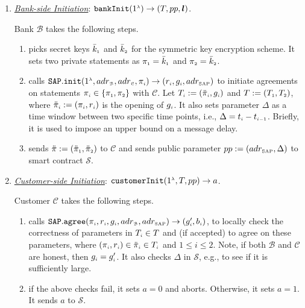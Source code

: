 \begin{enumerate}[leftmargin=.46cm]
\item\label{RCPoRP::Bank-side-Initiation}  \underline{\textit{Bank-side Initiation}}: $\mathtt{bankInit}(1^{\scriptscriptstyle \lambda})\rightarrow (T, pp, \bm l)$.

Bank $\mathcal{B}$ takes the following steps. 
\begin{enumerate}

\item\label{RCPoRP::setup} picks   secret keys $\bar k_{\scriptscriptstyle 1}$ and $\bar k_{\scriptscriptstyle 2}$ for the symmetric key encryption scheme. It  sets two private statements as $\pi_{\scriptscriptstyle 1}=\bar k_{\scriptscriptstyle 1}$ and $\pi_{\scriptscriptstyle 2}= \bar k_{\scriptscriptstyle 2}$.
%
\item\label{RCPoRP::set-qp}  calls $\mathtt{SAP.init}(1^{\scriptscriptstyle\lambda}, adr_{\scriptscriptstyle\mathcal{B}}, adr_{\scriptscriptstyle\mathcal{C}}, \pi_{\scriptscriptstyle i})\rightarrow(r_{
\scriptscriptstyle i}, g_{\scriptscriptstyle i}, adr_{\scriptscriptstyle\text{SAP}})$ to initiate  agreements on  statements $\pi_{\scriptscriptstyle i}\in \{\pi_{\scriptscriptstyle 1}, \pi_{\scriptscriptstyle 2}\}$  with  $\mathcal{C}$.  Let $T_{\scriptscriptstyle i}:=(\ddot{\pi}_{\scriptscriptstyle i}, g_{\scriptscriptstyle i})$ and $T:=(T_{\scriptscriptstyle 1}, T_{\scriptscriptstyle 2})$,  where  $\ddot{\pi}_{\scriptscriptstyle i}:=(\pi_{\scriptscriptstyle i}, r_{\scriptscriptstyle i})$ is the opening of $g_{\scriptscriptstyle i}$.  It also sets parameter $\Delta$ as a time window between two specific time points, i.e., $\Delta=t_{\scriptscriptstyle i} - t_{\scriptscriptstyle i-1}$. Briefly, it is used to impose an upper bound on a message delay.  %
%
\item sends $\ddot{\pi}:=(\ddot{\pi}_{\scriptscriptstyle 1}, \ddot{\pi}_{\scriptscriptstyle 2})$ to   $\mathcal{C}$ and   sends  public parameter $pp:=(adr_{\scriptscriptstyle\text{SAP}},\Delta)$ to  smart contract $\mathcal{S}$.
%
\end{enumerate}


\item  \underline{\textit{Customer-side Initiation}}\label{customer-side-Initiation}: $\mathtt{customerInit} (1^{\scriptscriptstyle \lambda}, T, pp)\rightarrow a$.
%

Customer $\mathcal{C}$ takes the following steps. 

\begin{enumerate}
%
\item\label{customer-side-Initiation-SAP-agree} calls   $\mathtt{SAP.agree}(\pi_{\scriptscriptstyle i}, r_{\scriptscriptstyle i}, g_{\scriptscriptstyle i}, adr_{\scriptscriptstyle\mathcal{B}}, adr_{\scriptscriptstyle\text{SAP}})\rightarrow (g'_{\scriptscriptstyle i}, b_{\scriptscriptstyle i})$, to locally check the correctness of parameters in $T_{\scriptscriptstyle i}\in T$ and (if accepted) to agree on these parameters, where $(\pi_{\scriptscriptstyle i}, r_{\scriptscriptstyle i}) \in \ddot{\pi}_{\scriptscriptstyle i}\in T_{\scriptscriptstyle i}$ and $1\leq i \leq 2$. Note,  if both $\mathcal{B}$ and $\mathcal{C}$ are honest, then $g_{\scriptscriptstyle i}=g'_{\scriptscriptstyle i}$. It also checks $\Delta$ in  $\mathcal{S}$, e.g., to see if it is sufficiently large.
%
\item if the above checks fail,  it sets $a=0$ and aborts. Otherwise, it sets $a=1$. It sends $a$ to $\mathcal{S}$. 
\end{enumerate}
%


\end{enumerate}
